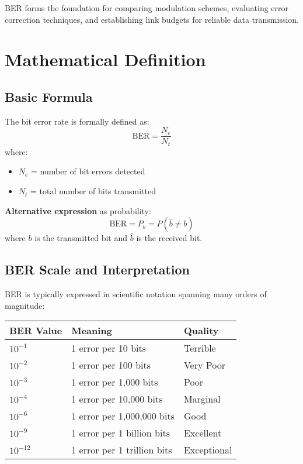 BER forms the foundation for comparing modulation schemes, evaluating error correction techniques, and establishing link budgets for reliable data transmission.

\section{Mathematical Definition}

\subsection{Basic Formula}

The bit error rate is formally defined as:
\begin{equation}
\mathrm{BER} = \frac{N_e}{N_t}
\label{eq:ber-definition}
\end{equation}
where:
\begin{itemize}
\item $N_e$ = number of bit errors detected
\item $N_t$ = total number of bits transmitted
\end{itemize}

\textbf{Alternative expression} as probability:
\begin{equation}
\mathrm{BER} = P_b = P(\hat{b} \neq b)
\label{eq:ber-probability}
\end{equation}
where $b$ is the transmitted bit and $\hat{b}$ is the received bit.

\subsection{BER Scale and Interpretation}

BER is typically expressed in scientific notation spanning many orders of magnitude:

\begin{center}
\begin{tabular}{@{}lll@{}}
\toprule
BER Value & Meaning & Quality \\
\midrule
$10^{-1}$ & 1 error per 10 bits & Terrible \\
$10^{-2}$ & 1 error per 100 bits & Very Poor \\
$10^{-3}$ & 1 error per 1,000 bits & Poor \\
$10^{-4}$ & 1 error per 10,000 bits & Marginal \\
$10^{-6}$ & 1 error per 1,000,000 bits & Good \\
$10^{-9}$ & 1 error per 1 billion bits & Excellent \\
$10^{-12}$ & 1 error per 1 trillion bits & Exceptional \\
\bottomrule
\end{tabular}
\end{center}

